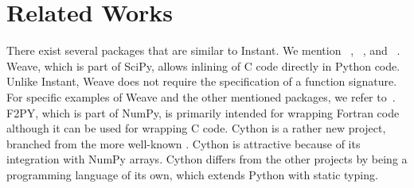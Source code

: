 \section{Related Works}
There exist several packages that are similar to Instant.
We mention  ~\citet{www:weave},
~\citet{EwingBradshawBehnelEtAl2009}, and
~\citet{Peterson}.
Weave, which is part of SciPy,  allows  inlining of C code directly in Python code. 
Unlike Instant, Weave does not require the specification of a function
signature. For specific examples of Weave and the
other mentioned packages, we refer to~\citep{WilbersLangtangenO2009}. 
F2PY, which is part of NumPy, is primarily intended
for wrapping Fortran code although it can be used for wrapping C code.
Cython is a rather new project, branched from the more well-known 
\citet{Ewing2009}. Cython is attractive because of  its integration
with NumPy arrays. Cython differs from the other projects by being a programming
language of its own, which extends Python with static typing.


